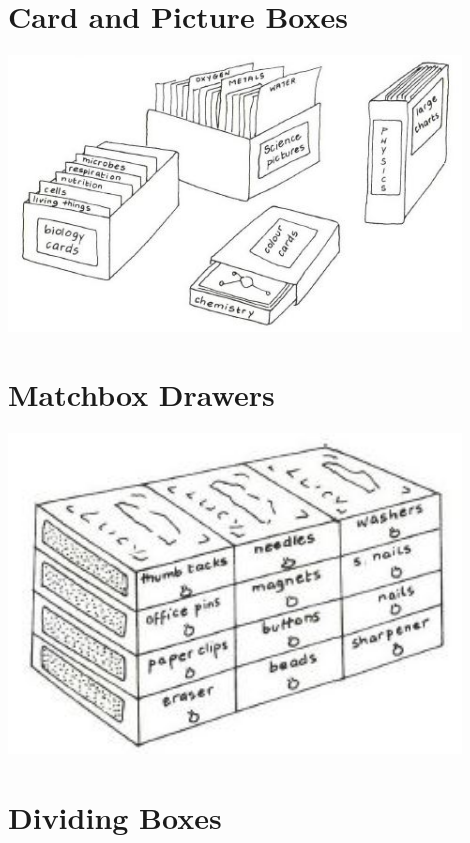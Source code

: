 \section{Card and Picture Boxes}

\begin{center}
\includegraphics[width=12cm]{./img/vso/card-boxes.jpg}
\end{center}


\section{Matchbox Drawers}

\begin{center}
\includegraphics[width=12cm]{./img/vso/matchbox-drawer.jpg}
\end{center}


\section{Dividing Boxes}

